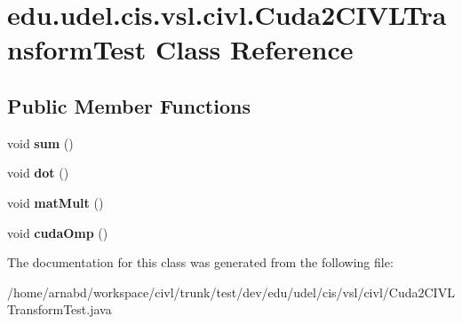 \hypertarget{classedu_1_1udel_1_1cis_1_1vsl_1_1civl_1_1Cuda2CIVLTransformTest}{}\section{edu.\+udel.\+cis.\+vsl.\+civl.\+Cuda2\+C\+I\+V\+L\+Transform\+Test Class Reference}
\label{classedu_1_1udel_1_1cis_1_1vsl_1_1civl_1_1Cuda2CIVLTransformTest}
\subsection*{Public Member Functions}
\begin{DoxyCompactItemize}
\item 
\hypertarget{classedu_1_1udel_1_1cis_1_1vsl_1_1civl_1_1Cuda2CIVLTransformTest_a7bc9102ddb4245b88a7bf901c5a1f8b0}{}void {\bfseries sum} ()\label{classedu_1_1udel_1_1cis_1_1vsl_1_1civl_1_1Cuda2CIVLTransformTest_a7bc9102ddb4245b88a7bf901c5a1f8b0}

\item 
\hypertarget{classedu_1_1udel_1_1cis_1_1vsl_1_1civl_1_1Cuda2CIVLTransformTest_a8e2a5e5b6d7d293cd60173bfd98f2255}{}void {\bfseries dot} ()\label{classedu_1_1udel_1_1cis_1_1vsl_1_1civl_1_1Cuda2CIVLTransformTest_a8e2a5e5b6d7d293cd60173bfd98f2255}

\item 
\hypertarget{classedu_1_1udel_1_1cis_1_1vsl_1_1civl_1_1Cuda2CIVLTransformTest_aaee96f2276c3164285d2c42ad443855a}{}void {\bfseries mat\+Mult} ()\label{classedu_1_1udel_1_1cis_1_1vsl_1_1civl_1_1Cuda2CIVLTransformTest_aaee96f2276c3164285d2c42ad443855a}

\item 
\hypertarget{classedu_1_1udel_1_1cis_1_1vsl_1_1civl_1_1Cuda2CIVLTransformTest_a182ca315bf737443638f257602ca83fe}{}void {\bfseries cuda\+Omp} ()\label{classedu_1_1udel_1_1cis_1_1vsl_1_1civl_1_1Cuda2CIVLTransformTest_a182ca315bf737443638f257602ca83fe}

\end{DoxyCompactItemize}


The documentation for this class was generated from the following file\+:\begin{DoxyCompactItemize}
\item 
/home/arnabd/workspace/civl/trunk/test/dev/edu/udel/cis/vsl/civl/Cuda2\+C\+I\+V\+L\+Transform\+Test.\+java\end{DoxyCompactItemize}
